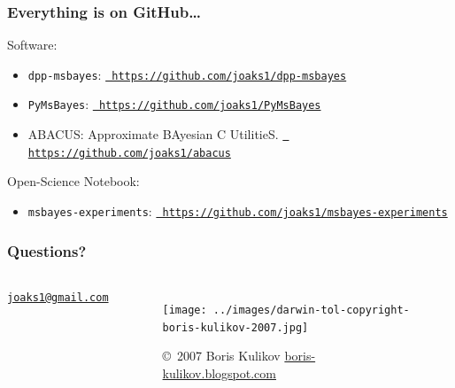\begin{frame}
    \frametitle{Everything is on GitHub\ldots}
    Software:\\
    \begin{itemize}
        \item \texttt{dpp-msbayes}:
            \href{https://github.com/joaks1/dpp-msbayes}{\tt
            https://github.com/joaks1/dpp-msbayes}

        \item \texttt{PyMsBayes}:
            \href{https://github.com/joaks1/PyMsBayes}{\tt
            https://github.com/joaks1/PyMsBayes}

        \item ABACUS: Approximate BAyesian C UtilitieS.
            \href{https://github.com/joaks1/abacus}{\tt
            https://github.com/joaks1/abacus}
    \end{itemize}

    \medskip
    Open-Science Notebook:\\
    \begin{itemize}
        \item \texttt{msbayes-experiments}:
            \href{https://github.com/joaks1/msbayes-experiments}{\tt
            https://github.com/joaks1/msbayes-experiments}
    \end{itemize}
\end{frame}

\begin{frame}
    \frametitle{Questions?}    
    \begin{columns}[c]
        \begin{center}
            {
            \Large
            \href{mailto:joaks1@gmail.com}{\tt joaks1@gmail.com}
            }
        \end{center}
            \begin{figure}
                \begin{center}
                \texttt{[image: ../images/darwin-tol-copyright-boris-kulikov-2007.jpg]}
                \caption{\tiny \copyright~2007 Boris Kulikov \href{http://boris-kulikov.blogspot.com/}{boris-kulikov.blogspot.com}}
                \end{center}
            \end{figure}
    \end{columns}
\end{frame}


